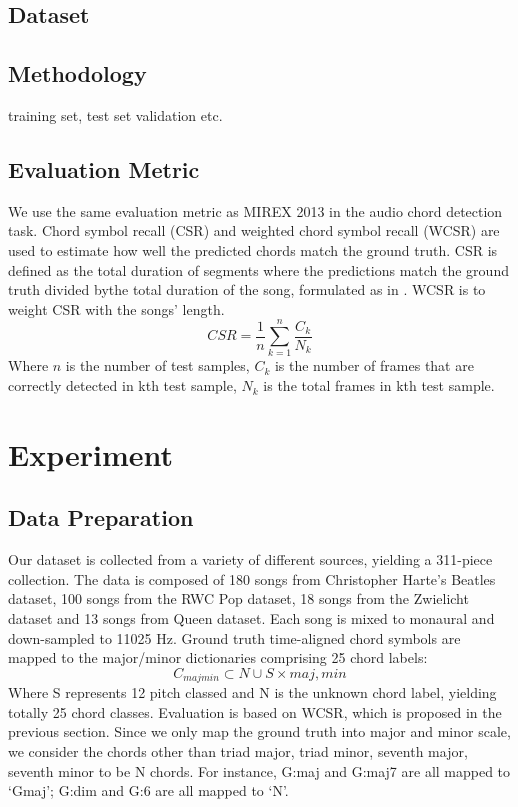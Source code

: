 \documentclass{article}
\begin{document}
\subsection{Dataset}
\subsection{Methodology}
training set, test set validation etc.
\subsection{Evaluation Metric}
We use the same evaluation metric as MIREX 2013 in the audio chord detection task. Chord symbol recall (CSR) and weighted chord symbol recall (WCSR) are used to estimate how well the predicted chords match the ground truth. CSR is defined as the total duration of segments where the predictions match the ground truth divided bythe total duration of the song, formulated as in . WCSR is to weight CSR with the songs' length.  
\begin{equation}\label{csr}
CSR = \frac{1}{n} \sum_{k=1}^n \frac{C_{k}}{N_{k}}
\end{equation}
Where $n$ is the number of test samples, $C_{k}$ is the number of frames that are correctly detected in kth test sample, $N_{k}$ is the total frames in kth test sample. 

\section{Experiment}
\subsection{Data Preparation}
Our dataset is collected from a variety of different sources, yielding a 311-piece collection. The data is composed of 180 songs from Christopher Harte's Beatles dataset, 100 songs from the RWC Pop dataset, 18 songs from the Zwielicht dataset and 13 songs from Queen dataset. Each song is mixed to monaural and down-sampled to 11025 Hz. Ground truth time-aligned chord symbols are mapped to the major/minor dictionaries comprising 25 chord labels:
\begin{equation}
C_{majmin} \subset {N} \cup S \times {maj,min}
\end{equation}
Where S represents 12 pitch classed and N is the unknown chord label, yielding totally 25 chord classes. Evaluation is based on WCSR, which is proposed in the previous section. Since we only map the ground truth into major and minor scale, we consider the chords other than triad major, triad minor, seventh major, seventh minor to be N chords. For instance, G:maj and G:maj7 are all mapped to `Gmaj'; G:dim and G:6 are all mapped to `N'. 
\end{document}
